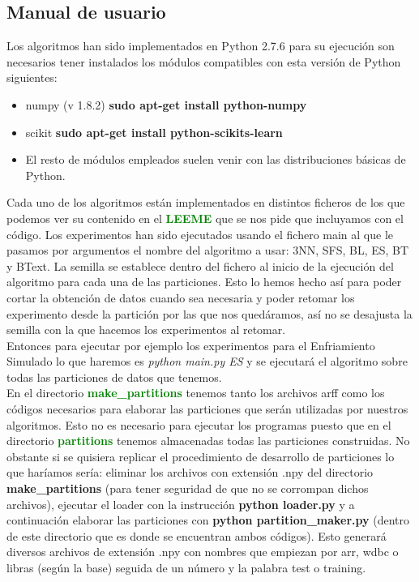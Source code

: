 \documentclass[10pt,a4paper]{article}
\begin{document}
\subsection{\color[rgb]{0.0,0.0,0.51}Manual de usuario}
Los algoritmos han sido implementados en Python 2.7.6 para su ejecución son necesarios tener instalados los módulos compatibles con esta versión de Python siguientes:\\

\begin{itemize}
\item numpy (v 1.8.2) \textbf{sudo apt-get install python-numpy}
\item scikit \textbf{sudo apt-get install python-scikits-learn}
\item El resto de módulos empleados suelen venir con las distribuciones básicas de Python.
\end{itemize}

Cada uno de los algoritmos están implementados en distintos ficheros de los que podemos ver su contenido en el \textbf{\textcolor{green}{LEEME}} que se nos pide que incluyamos con el código. Los experimentos han sido ejecutados usando el fichero main al que le pasamos por argumentos el nombre del algoritmo a usar: 3NN, SFS, BL, ES, BT y BText. La semilla se establece dentro del fichero al inicio de la ejecución del algoritmo para cada una de las particiones. Esto lo hemos hecho así para poder cortar la obtención de datos cuando sea necesaria y poder retomar los experimento desde la partición por las que nos quedáramos, así no se desajusta la semilla con la que hacemos los experimentos al retomar.\\

Entonces para ejecutar por ejemplo los experimentos para el Enfriamiento Simulado lo que haremos es \textit{python main.py ES} y se ejecutará el algoritmo sobre todas las particiones de datos que tenemos.\\

En el directorio \textbf{\textcolor{green}{make\_partitions}} tenemos tanto los archivos arff como los códigos necesarios para elaborar las particiones que serán utilizadas por nuestros algoritmos. Esto no es necesario para ejecutar los programas puesto que en el directorio \textbf{\textcolor{green}{partitions}} tenemos almacenadas todas las particiones construidas. No obstante si se quisiera replicar el procedimiento de desarrollo de particiones lo que haríamos sería: eliminar los archivos con extensión .npy del directorio \textbf{make\_partitions} (para tener seguridad de que no se corrompan dichos archivos), ejecutar el loader con la instrucción \textbf{python loader.py} y a continuación elaborar las particiones con \textbf{python partition\_maker.py} (dentro de este directorio que es donde se encuentran ambos códigos). Esto generará diversos archivos de extensión .npy con nombres que empiezan por arr, wdbc o libras (según la base) seguida de un número y la palabra test o training.\\
\end{document}
